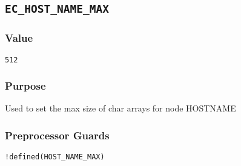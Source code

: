 
\subsection{\texttt{EC\_HOST\_NAME\_MAX}}
\vspace{-2ex}
\subsubsection{Value}
\vspace{-2ex}
\texttt{512}

\vspace{-2ex}
\subsubsection{Purpose}
\vspace{-2ex}
Used to set the max size of char arrays for node HOSTNAME

\vspace{-2ex}
\subsubsection{Preprocessor Guards}
\vspace{-2ex}
\verb|!defined(HOST_NAME_MAX)|